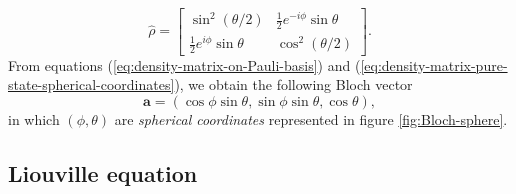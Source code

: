 \begin{equation}
	\hat{\rho} = \left[ \begin{matrix} \sin^2(\theta/2) & \frac{1}{2}e^{-i\phi}\sin\theta \\ \frac{1}{2}e^{i\phi}\sin\theta & \cos^2(\theta/2) \end{matrix} \right].
	\label{eq:density-matrix-pure-state-spherical-coordinates}
\end{equation}
From equations (\ref{eq:density-matrix-on-Pauli-basis}) and (\ref{eq:density-matrix-pure-state-spherical-coordinates}), we obtain the following Bloch vector
\begin{equation}
	\mathbf{a} = (\cos\phi \sin\theta, \sin\phi \sin\theta, \cos\theta),
\end{equation}
in which $ (\phi, \theta) $ are \textit{spherical coordinates} represented in figure \ref{fig:Bloch-sphere}.

%
\subsection{Liouville equation}
\label{sec:Liouville-equations}
%

